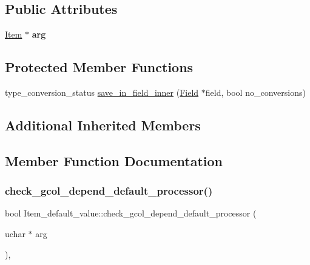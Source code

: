 \subsection*{Public Attributes}
\begin{DoxyCompactItemize}
\item 
\mbox{\label{classItem__default__value_aa09cdd162256d99a82935c67143f494b}} 
\mbox{\hyperlink{classItem}{Item}} $\ast$ {\bfseries arg}
\end{DoxyCompactItemize}
\subsection*{Protected Member Functions}
\begin{DoxyCompactItemize}
\item 
type\+\_\+conversion\+\_\+status \mbox{\hyperlink{classItem__default__value_addb79dad1639e8088ae278397d637fee}{save\+\_\+in\+\_\+field\+\_\+inner}} (\mbox{\hyperlink{classField}{Field}} $\ast$field, bool no\+\_\+conversions)
\end{DoxyCompactItemize}
\subsection*{Additional Inherited Members}


\subsection{Member Function Documentation}
\mbox{\label{classItem__default__value_a309bddf86a7472371f02ab9ed80e6b27}} 
\subsubsection{\texorpdfstring{check\+\_\+gcol\+\_\+depend\+\_\+default\+\_\+processor()}{check\_gcol\_depend\_default\_processor()}}
{\footnotesize\ttfamily bool Item\+\_\+default\+\_\+value\+::check\+\_\+gcol\+\_\+depend\+\_\+default\+\_\+processor (\begin{DoxyParamCaption}\item[{uchar $\ast$}]{arg }\end{DoxyParamCaption})\hspace{0.3cm}{\ttfamily [inline]}, {\ttfamily [virtual]}}

